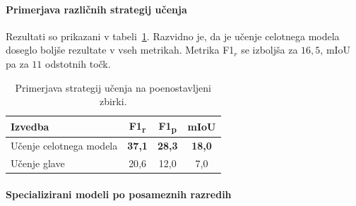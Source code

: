 \documentclass[a4paper,twoside,openright,12pt,slovene]{book}
\begin{document}
            \FloatBarrier

            \paragraph{Primerjava različnih strategij učenja}

            Rezultati so prikazani v
            tabeli~\ref{tab:eir-strategije-ucenja}.
            Razvidno je, da je učenje celotnega modela doseglo boljše rezultate v
            vseh metrikah. Metrika F1$_r$ se izboljša za $16{,}5$, mIoU pa za
            $11$ odstotnih točk.

            \begin{table}[t]
                \centering
                \begin{tabular}{lccc}
                    \toprule
                    \textbf{Izvedba}                 & \textbf{F1\textsubscript{r}} & \textbf{F1\textsubscript{p}} & \textbf{mIoU} \\
                    \midrule
                    Učenje celotnega modela & \textbf{37{,}1} & \textbf{28{,}3} & \textbf{18{,}0} \\
                    Učenje glave            & 20{,}6 & 12{,}0 &  7{,}0 \\
                    \bottomrule
                \end{tabular}
                \caption{Primerjava strategij učenja na poenostavljeni zbirki.}
                \label{tab:eir-strategije-ucenja}
            \end{table}

            \paragraph{Specializirani modeli po posameznih razredih}
\end{document}
